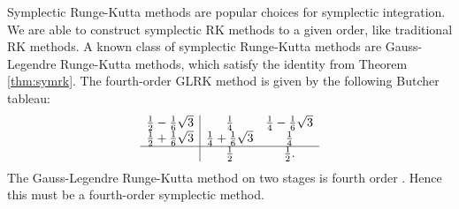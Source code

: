 \documentclass{report}
\newtheorem{theorem}{Theorem}[chapter]
\theoremstyle{exampstyle} \newtheorem{example}[theorem]{Example}
\theoremstyle{exampstyle} \newtheorem{remark}[theorem]{Remark}
\theoremstyle{exampstyle} \newtheorem{definition}[theorem]{Definition}
\theoremstyle{exampstyle} \newtheorem{lemma}[theorem]{Lemma}
\theoremstyle{exampstyle} \newtheorem{proposition}[theorem]{Proposition}
\begin{document}



Symplectic Runge-Kutta methods are popular choices for symplectic integration.
We are able to construct symplectic RK methods to a given order, like traditional RK methods.
A known class of symplectic Runge-Kutta methods are Gauss-Legendre Runge-Kutta methods, which satisfy the identity from Theorem \ref{thm:symrk}.
The fourth-order GLRK method is given by the following Butcher tableau:
\begin{equation*}
	\begin{array}{c|cc}
		\frac{1}{2} - \frac{1}{6}\sqrt{3}  &\frac{1}{4} &\frac{1}{4} - \frac{1}{6}\sqrt{3} \\
		\frac{1}{2} + \frac{1}{6}\sqrt{3}  &\frac{1}{4} + \frac{1}{6}\sqrt{3} &\frac{1}{4} \\
		\hline
		&\frac{1}{2} &\frac{1}{2}.
	\end{array}
\end{equation*}
The Gauss-Legendre Runge-Kutta method on two stages is fourth order \cite{iserles2009rk}.
Hence this must be a fourth-order symplectic method.
\end{document}
